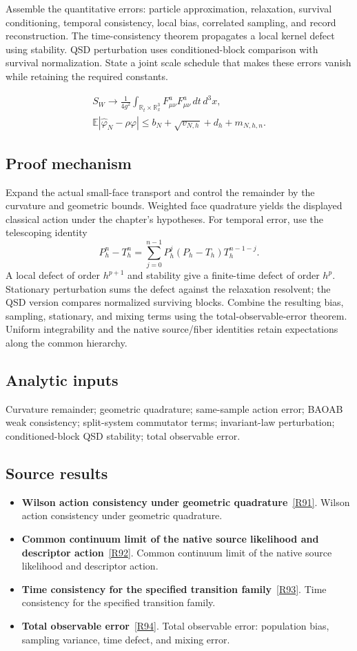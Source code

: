 \documentclass[11pt,a4paper]{article}
\begin{document}
Assemble the quantitative errors: particle approximation, relaxation, survival conditioning, temporal consistency, local bias, correlated sampling, and record reconstruction. The time-consistency theorem propagates a local kernel defect using stability. QSD perturbation uses conditioned-block comparison with survival normalization. State a joint scale schedule that makes these errors vanish while retaining the required constants.


\begin{gather*}
S_W\longrightarrow \frac1{4g^2}\int_{\mathbb R_t\times\mathbb R_x^3}
F_{\mu\nu}^aF_{\mu\nu}^a\,dt\,d^3x,\\
\mathbb E|\widehat\varphi_N-\rho\varphi|
\le b_N+\sqrt{v_{N,h}}+d_h+m_{N,h,n}.
\end{gather*}
\subsection*{Proof mechanism}
Expand the actual small-face transport and control the remainder by the curvature and geometric bounds. Weighted face quadrature yields the displayed classical action under the chapter's hypotheses. For temporal error, use the telescoping identity
\[P_h^n-T_h^n=\sum_{j=0}^{n-1}P_h^j(P_h-T_h)T_h^{n-1-j}.\]
A local defect of order \(h^{p+1}\) and stability give a finite-time defect of order \(h^p\). Stationary perturbation sums the defect against the relaxation resolvent; the QSD version compares normalized surviving blocks. Combine the resulting bias, sampling, stationary, and mixing terms using the total-observable-error theorem. Uniform integrability and the native source/fiber identities retain expectations along the common hierarchy.
\subsection*{Analytic inputs}
Curvature remainder; geometric quadrature; same-sample action error; BAOAB weak consistency; split-system commutator terms; invariant-law perturbation; conditioned-block QSD stability; total observable error.
\subsection*{Source results}
\begin{itemize}
\item \textbf{Wilson action consistency under geometric quadrature}~\hyperref[src:thm-continuum-limit-ym]{[R91]}. Wilson action consistency under geometric quadrature.
\item \textbf{Common continuum limit of the native source likelihood and descriptor action}~\hyperref[src:thm-ym-continuum-source-action]{[R92]}. Common continuum limit of the native source likelihood and descriptor action.
\item \textbf{Time consistency for the specified transition family}~\hyperref[src:thm-correct-continuum-limit]{[R93]}. Time consistency for the specified transition family.
\item \textbf{Total observable error}~\hyperref[src:thm-total-error-bound]{[R94]}. Total observable error: population bias, sampling variance, time defect, and mixing error.
\end{itemize}
\end{document}
